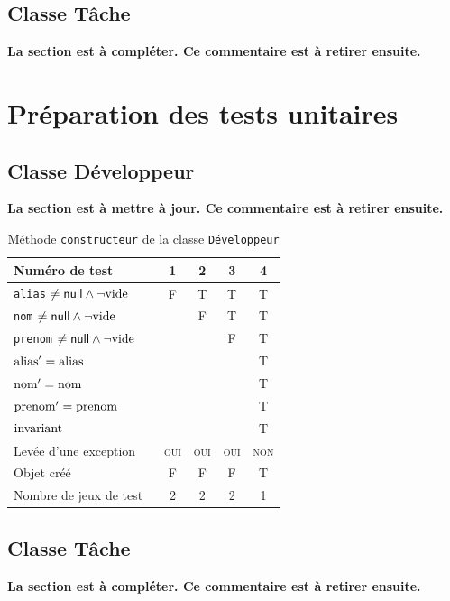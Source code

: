 \documentclass[11pt,article]{article}
\newcommand{\nullvalue}{\textsf{null}\xspace}
\newcommand{\invariant}{\ensuremath\mathrm{invariant}}
\begin{document}
\newpage

\subsection{Classe \textsf{Tâche}}

{\noindent\color{red}\textbf{La section est à compléter. Ce
    commentaire est à retirer ensuite.}}

\newpage

\section{Préparation des tests unitaires}

\subsection{Classe \textsf{Développeur}}

{\noindent\color{red}\textbf{La section est à mettre à jour. Ce
    commentaire est à retirer ensuite.}}

\begin{table}[!ht]
\begin{center}
\begin{tabular}{|p{0.6\linewidth}|c|c|c|c|}
\hline
Numéro de test
&1&2&3&4\\
\hline
\hline
\texttt{alias} $\neq \nullvalue \land \neg \emptystring$
&F&T&T&T\\
\hline
\texttt{nom} $\neq \nullvalue \land \neg \emptystring$
& &F&T&T\\
\hline
\texttt{prenom} $\neq \nullvalue \land \neg \emptystring$
& & &F&T\\
\hline
\hline
$\mathrm{alias}' = \mathrm{alias}$
& & & &T\\
\hline
$\mathrm{nom}' = \mathrm{nom}$
& & & &T\\
\hline
$\mathrm{prenom}' = \mathrm{prenom}$
& & & &T\\
\hline
$\invariant$
& & & &T\\
\hline
Levée d'une exception&\textsc{oui}&\textsc{oui}&\textsc{oui}&\textsc{non}\\
\hline
\hline
Objet créé
&F&F&F&T\\
\hline
\hline
Nombre de jeux de test 
&2&2&2&1\\
\hline
\end{tabular}
\caption{Méthode \texttt{constructeur} de la classe
  \texttt{Développeur}}
\end{center}
\end{table}

\subsection{Classe \textsf{Tâche}}

{\noindent\color{red}\textbf{La section est à compléter. Ce
    commentaire est à retirer ensuite.}}
\end{document}
